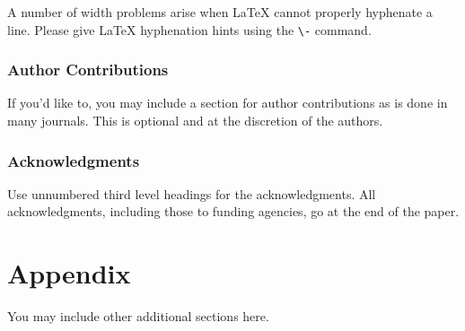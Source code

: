 \documentclass{article} %
\begin{document}
A number of width problems arise when LaTeX cannot properly hyphenate a
line. Please give LaTeX hyphenation hints using the \verb+\-+ command.

\subsubsection*{Author Contributions}
If you'd like to, you may include  a section for author contributions as is done
in many journals. This is optional and at the discretion of the authors.

\subsubsection*{Acknowledgments}
Use unnumbered third level headings for the acknowledgments. All
acknowledgments, including those to funding agencies, go at the end of the paper.
\fi





\appendix
\section{Appendix}
You may include other additional sections here.
\end{document}
